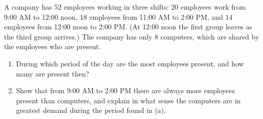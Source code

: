 A company has $52$ employees working in three shifts: $20$ employees work from 9:00 AM to 12:00 noon, $18$ employees from 11:00 AM to 2:00 PM, and $14$ employees from 12:00 noon to 2:00 PM. (At 12:00 noon the first group leaves as the third group arrives.) The company has only $8$ computers, which are shared by the employees who are present.
\begin{enumerate}
\item[(a)] During which period of the day are the most employees present, and how many are present then?
\item[(b)] Show that from 9:00 AM to 2:00 PM there are always more employees present than computers, and explain in what sense the computers are in greatest demand during the period found in (a).
\end{enumerate}

